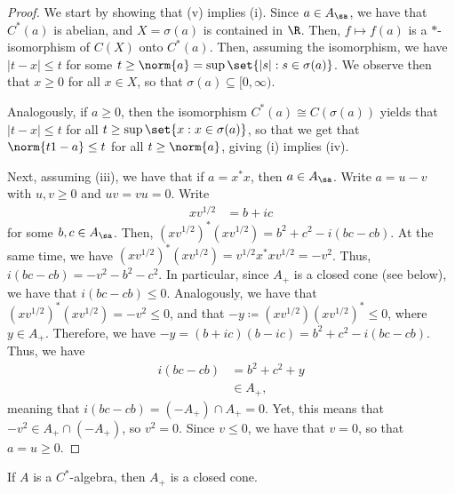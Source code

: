 \documentclass[10pt]{mypackage}
\renewcommand{\coloneq}{\coloneqq}
\begin{document}
\begin{proof}
  We start by showing that (v) implies (i). Since $a\in A_{\sa}$, we have that $C^{\ast}\left( a \right)$ is abelian, and $X = \sigma\left( a \right)$ is contained in $\R$. Then, $f\mapsto f(a)$ is a $\ast$-isomorphism of $C(X)$ onto $C^{\ast}\left( a \right)$. Then, assuming the isomorphism, we have $\left\vert t-x \right\vert\leq t$ for some $t\geq \norm{a} = \sup\set{\left\vert s \right\vert : s\in \sigma(a)}$. We observe then that $x\geq 0$ for all $x\in X$, so that $\sigma(a)\subseteq [0,\infty)$.

  Analogously, if $a\geq 0$, then the isomorphism $C^{\ast}\left( a \right)\cong C\left( \sigma(a) \right)$ yields that $\left\vert t-x \right\vert\leq t$ for all $t\geq \sup\set{x : x\in \sigma(a)}$, so that we get that $\norm{t1-a}\leq t$ for all $t\geq \norm{a}$, giving (i) implies (iv).

  Next, assuming (iii), we have that if $a = x^{\ast}x$, then $a\in A_{\sa}$. Write $a = u-v$ with $u,v\geq 0$ and $uv=vu = 0$. Write
  \begin{align*}
    xv^{1/2} &= b + ic
  \end{align*}
  for some $b,c\in A_{\sa}$. Then, $\left( xv^{1/2} \right)^{\ast}\left( xv^{1/2} \right) = b^2 + c^2 - i\left( bc-cb \right)$. At the same time, we have $\left( xv^{1/2} \right)^{\ast}\left( xv^{1/2} \right) = v^{1/2}x^{\ast}xv^{1/2} = -v^2$. Thus, $i\left( bc-cb \right) = -v^2-b^2-c^2$. In particular, since $A_{+}$ is a closed cone (see below), we have that $i\left( bc-cb \right) \leq 0$. Analogously, we have that $\left( xv^{1/2} \right)^{\ast}\left( xv^{1/2} \right)= -v^2\leq 0$, and that $-y\coloneq \left( xv^{1/2} \right)\left( xv^{1/2} \right)^{\ast}\leq 0$, where $y\in A_{+}$. Therefore, we have $-y = \left( b+ic \right)\left( b-ic \right) = b^2 + c^2 - i\left( bc-cb \right)$. Thus, we have
  \begin{align*}
    i\left( bc-cb \right) &= b^2 + c^2 + y\\
                          &\in A_{+},
  \end{align*}
  meaning that $i\left( bc-cb \right) = \left( -A_{+} \right)\cap A_{+} = 0$. Yet, this means that $-v^2 \in A_{+}\cap \left( -A_{+} \right)$, so $v^2 = 0$. Since $v\leq 0$, we have that $v = 0$, so that $a = u \geq 0$.
\end{proof}
\begin{proposition}
  If $A$ is a $C^{\ast}$-algebra, then $A_{+}$ is a closed cone.
\end{proposition}
\end{document}
